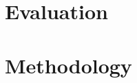 \documentclass{article}
\begin{document}
\section{Evaluation}

\section{Methodology}
\end{document}
